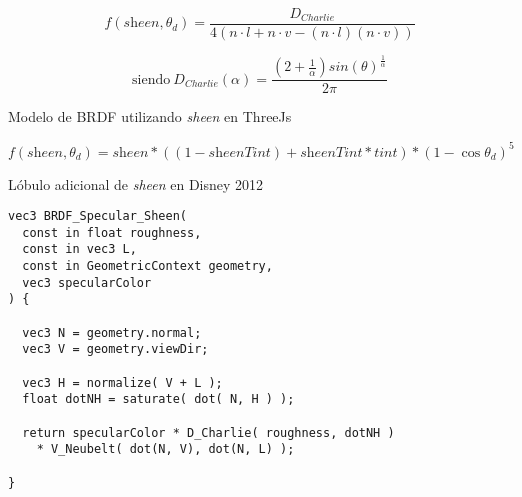   $$
  f(\textit{sheen}, \theta_d) =\frac{D_{Charlie}}{4(n\cdot{l} + n\cdot{v} - (n\cdot{l})(n\cdot{v}) )}
  $$
  \begin{eqfloat}[!htb]
    \begin{equation}
      \textrm{siendo}\ D_{Charlie}(\alpha) = \frac
      {(2 + \frac{1}{\alpha})sin(\theta)^\frac{1}{\alpha}}
      {2\pi}
    \end{equation}
  \caption{Modelo de BRDF utilizando \textit{sheen} en ThreeJs}
  \end{eqfloat}
  \singlespacing

  \begin{eqfloat}[!htb]
    \begin{equation}
      f(\textit{sheen}, \theta_d) = \textit{sheen} * ((1 - \textit{sheenTint}) + \textit{sheenTint} * \textit{tint}) * (1 - \cos\theta_d)^5
    \end{equation}
  \caption{L\'obulo adicional de \textit{sheen} en Disney 2012}
  \end{eqfloat}
  \singlespacing

  \begin{lstlisting}[caption={BRDF del modelo de \textit{sheen} de ThreeJs}]
vec3 BRDF_Specular_Sheen(
  const in float roughness,
  const in vec3 L,
  const in GeometricContext geometry,
  vec3 specularColor
) {

  vec3 N = geometry.normal;
  vec3 V = geometry.viewDir;

  vec3 H = normalize( V + L );
  float dotNH = saturate( dot( N, H ) );

  return specularColor * D_Charlie( roughness, dotNH )
    * V_Neubelt( dot(N, V), dot(N, L) );

}
  \end{lstlisting}